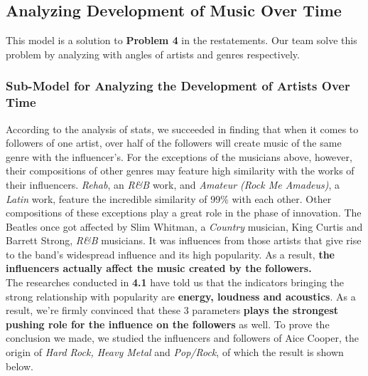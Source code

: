 \documentclass[12pt]{article}
\begin{document}
{{\subsection{Analyzing Development of Music Over Time}
This model is a solution to \textbf{Problem 4} in the restatements. Our team solve this problem by analyzing with angles of artists and genres respectively.
\subsubsection{Sub-Model for Analyzing the Development of Artists Over Time}
According to the analysis of stats, we succeeded in finding that when it comes to followers of one artist, over half of the followers will create music of the same genre with the influencer's. For the exceptions of the musicians above, however, their compositions of other genres may feature high similarity with the works of their influencers. \textit{Rehab}, an \textit{R\&B} work, and \textit{Amateur (Rock Me Amadeus)}, a \textit{Latin} work, feature the incredible similarity of 99\% with each other. Other compositions of these exceptions play a great role in the phase of innovation. The Beatles once got affected by Slim Whitman, a \textit{Country} musician, King Curtis and Barrett Strong, \textit{R\&B} musicians. It was influences from those artists that give rise to the band's widespread influence and its high popularity. As a result, \textbf{the influencers actually affect the music created by the followers.}\\[2ex]
The researches conducted in \textbf{4.1} have told us that the indicators bringing the strong relationship with popularity are \textbf{energy, loudness and acoustics}. As a result, we're firmly convinced that these 3 parameters \textbf{plays the strongest pushing role for the influence on the followers} as well. To prove the conclusion we made, we studied the influencers and followers of Aice Cooper, the origin of \textit{Hard Rock, Heavy Metal} and \textit{Pop/Rock}, of which the result is shown below.
\begin{figure}[h]
\centering
	\begin{subfigure}[Followers of Alice Cooper]
		{\texttt{[image: Music18]}}
	\end{subfigure}
	\hspace{1.5cm}
	\begin{subfigure}[Influencers of Alice Cooper]
		{\texttt{[image: Music17]}}
	\end{subfigure}
\end{figure}\\
}}
\end{document}
